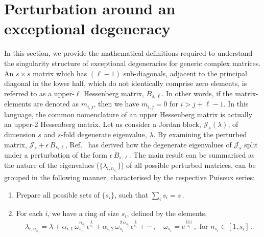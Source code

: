 \documentclass[aps, prb, onecolumn, nofootinbib, citeautoscript, 10pt]{revtex4-2}
\begin{document}
\section{Perturbation around an exceptional degeneracy}
\label{sechess}

In this section, we provide the mathematical definitions required to understand the singularity structure of exceptional degeneracies for generic complex matrices. An $s\times s$ matrix which has $(\ell-1)$ sub-diagonals, adjacent to the principal diagonal in the lower half, which do not identically comprise zero elements, is referred to as a upper-$\ell$ Hessenberg matrix, $B_{s, \ell}$. In other words, if the matrix-elements are denoted as $m_{i,j}$, then we have $m_{i, j} = 0 $ for $i > j + \ell-1$. In this language, the common nomenclature of an upper Hessenberg matrix is actually an upper-2 Hessenberg matrix. Let us consider a Jordan block, $ \mathcal {J}_s (\lambda) $,
of dimension $s$ and $s$-fold degenerate eigenvalue, $\lambda $. By examining the perturbed matrix, $ \mathcal {J}_s + \epsilon \, B_{s, \ell} $, Ref.~\cite{ma-pert} has derived how the degenerate eigenvalues of $ \mathcal {J}_s  $ split under a perturbation of the form  $\epsilon \, B_{s, \ell}$. The main result can be summarised as the nature of the eigenvalues ($\lbrace \lambda_{i, n_{s_i}} \rbrace $) of all possible perturbed matrices, can be grouped in the following manner, characterised by the respective Puiseux series:
\begin{enumerate}

\item Prepare all possible sets of $\lbrace s_i \rbrace $, such that $\sum_i s_i =  s \,.$

\item For each $i$, we have a ring of size $s_i$, defined by the elements,
\begin{align}
\lambda_{i, n_{s_i}} = \lambda + \alpha_{i, 1}\, \omega_{s_i}^{n_{s_i}} \,\epsilon^{\frac{1}{s_i}}
+ \alpha_{i, 2}\, \omega_{s_i}^{ 2\,n_{s_i}} \,\epsilon^{\frac{2}{s_i}} + \cdots\,,
\quad \omega_{s_i} = e^{\frac{2\,\pi\,i} {s_i}}\,,
\text{ for } n_{s_i} \in [1, s_i]\,.
\end{align}

\end{enumerate}
\end{document}
